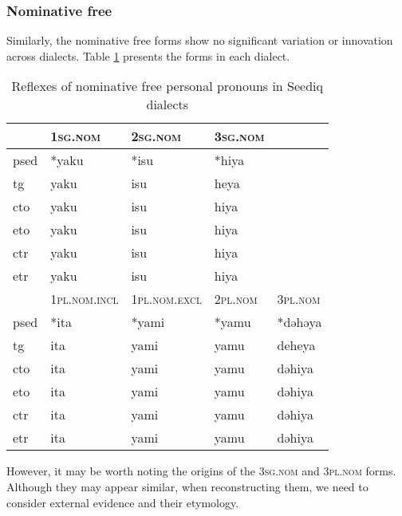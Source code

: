 \subsubsection{Nominative free}

Similarly, the nominative free forms show no significant variation or innovation across dialects. Table \ref{tab:nomfree} presents the forms in each dialect.

\begin{table}[!htbp]
\centering
\caption{Reflexes of nominative free personal pronouns in Seediq dialects}
\label{tab:nomfree}
\begin{tabular}{lllll}
\hline
      & \textsc{1sg.nom}      & \textsc{2sg.nom}      & \textsc{3sg.nom} &         \\ \hline
\acs{psed} & *yaku        & *isu         & *hiya   &         \\
\acs{tg}  & yaku         & isu          & heya    &         \\
\acs{cto}  & yaku         & isu          & hiya    &         \\
\acs{eto}  & yaku         & isu          & hiya    &         \\
\acs{ctr} & yaku         & isu          & hiya    &         \\
\acs{etr} & yaku         & isu          & hiya    &         \\ \hline
      & \textsc{1pl.nom.incl} & \textsc{1pl.nom.excl} & \textsc{2pl.nom} & \textsc{3pl.nom} \\ \hline
\acs{psed} & *ita         & *yami        & *yamu   & *dəhəya \\
\acs{tg}  & ita          & yami         & yamu    & deheya  \\
\acs{cto}  & ita          & yami         & yamu    & dəhiya  \\
\acs{eto}  & ita          & yami         & yamu    & dəhiya  \\
\acs{ctr} & ita          & yami         & yamu    & dəhiya  \\
\acs{etr} & ita          & yami         & yamu    & dəhiya  \\ \hline
\end{tabular}
\end{table}

However, it may be worth noting the origins of the \textsc{3sg.nom} and \textsc{3pl.nom} forms. Although they may appear similar, when reconstructing them, we need to consider external evidence and their etymology.

